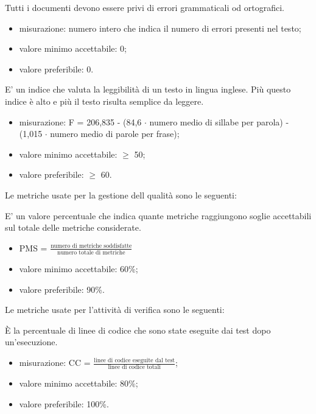 		Tutti i documenti devono essere privi di errori grammaticali od ortografici.
		\begin{itemize}
			\item{misurazione: numero intero che indica il numero di errori presenti nel testo;}
			\item{valore minimo accettabile: 0;}
			\item{valore preferibile: 0.}
		\end{itemize}
		
		E' un indice che valuta la leggibilità di un testo in lingua inglese. Più questo indice è alto e più il testo risulta semplice da leggere.
		 \begin{itemize}
			\item{misurazione: F = 206,835 - (84,6 $\cdot$ numero medio di sillabe per parola) - (1,015 $\cdot$ numero medio di parole per frase);}
			\item{valore minimo accettabile: $\geq$ 50;}
			\item{valore preferibile: $\geq$ 60.}
		\end{itemize}

	Le metriche usate per la gestione dell qualità sono le seguenti:
	
		E' un valore percentuale che indica quante metriche raggiungono soglie accettabili sul totale delle metriche considerate.
		\begin{itemize}
			\item{PMS = $\displaystyle\frac{\mbox{numero di metriche soddisfatte}}{\mbox{numero totale di metriche}}$}
			\item{valore minimo accettabile: 60\%;}
			\item{valore preferibile: 90\%.}
		\end{itemize}
					
	Le metriche usate per l'attività di verifica sono le seguenti:
	
		 È la percentuale di linee di codice che sono state eseguite dai test dopo un’esecuzione.
		 \begin{itemize}
			\item{misurazione: CC = $\displaystyle\frac{\mbox{linee di codice eseguite dal test}}{\mbox{linee di codice totali}}$;}
			\item{valore minimo accettabile: 80\%;}
			\item{valore preferibile: 100\%.}
		\end{itemize}


